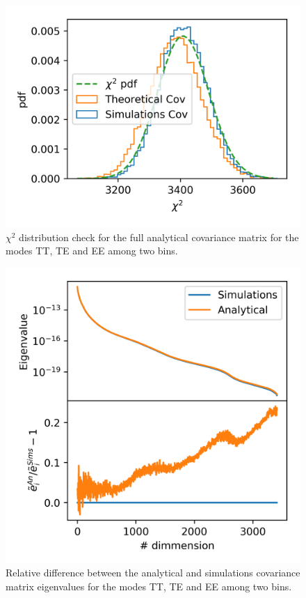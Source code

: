 \documentclass[useAMS,usenatbib]{mn2e}
\begin{document}
\begin{figure} %
  \centering
  \includegraphics[width=\columnwidth]{./figures/run_sph_2b_same_mask_Efstathiou_TTTEEE_Full_chi2.png}
  \caption{$\chi^2$ distribution check for the full analytical covariance
    matrix for the modes TT, TE and EE among two bins.}
  \label{fig:TTTEEE_chi2}
\end{figure}

\begin{figure} %
  \centering
  \includegraphics[width=\columnwidth]{./figures/run_sph_2b_same_mask_Efstathiou_TTTEEE_Full_reldev_eigval.png}
  \caption{Relative difference between the analytical and simulations
    covariance matrix eigenvalues for the modes TT, TE and EE among two bins.}
  \label{fig:TTTEEE_eigv}
\end{figure}
\end{document}
